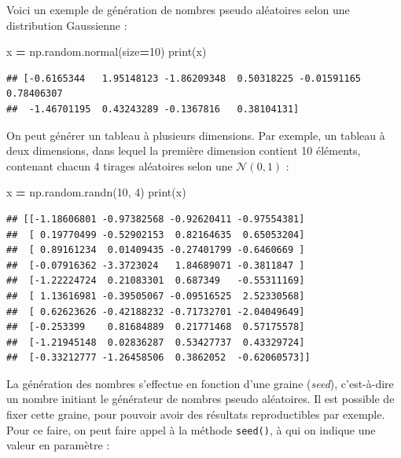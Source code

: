 \documentclass[
  12pt,
]{book}
\newenvironment{Shaded}{\begin{snugshade}}{\end{snugshade}}
\newcommand{\BuiltInTok}[1]{#1}
\newcommand{\DecValTok}[1]{\textcolor[rgb]{0.00,0.00,0.81}{#1}}
\newcommand{\NormalTok}[1]{#1}
\newcommand{\OperatorTok}[1]{\textcolor[rgb]{0.81,0.36,0.00}{\textbf{#1}}}
\numberwithin{equation}{section}
\numberwithin{countremarque}{section}
\begin{document}
Voici un exemple de génération de nombres pseudo aléatoires selon une distribution Gaussienne :

\begin{Shaded}
\begin{Highlighting}[]
\NormalTok{x }\OperatorTok{=}\NormalTok{ np.random.normal(size}\OperatorTok{=}\DecValTok{10}\NormalTok{)}
\BuiltInTok{print}\NormalTok{(x)}
\end{Highlighting}
\end{Shaded}

\begin{lstlisting}
## [-0.6165344   1.95148123 -1.86209348  0.50318225 -0.01591165  0.78406307
##  -1.46701195  0.43243289 -0.1367816   0.38104131]
\end{lstlisting}

On peut générer un tableau à plusieurs dimensions. Par exemple, un tableau à deux dimensions, dans lequel la première dimension contient 10 éléments, contenant chacun 4 tirages aléatoires selon une \(\mathcal{N}(0,1)\) :

\begin{Shaded}
\begin{Highlighting}[]
\NormalTok{x }\OperatorTok{=}\NormalTok{ np.random.randn(}\DecValTok{10}\NormalTok{, }\DecValTok{4}\NormalTok{)}
\BuiltInTok{print}\NormalTok{(x)}
\end{Highlighting}
\end{Shaded}

\begin{lstlisting}
## [[-1.18606801 -0.97382568 -0.92620411 -0.97554381]
##  [ 0.19770499 -0.52902153  0.82164635  0.65053204]
##  [ 0.89161234  0.01409435 -0.27401799 -0.6460669 ]
##  [-0.07916362 -3.3723024   1.84689071 -0.3811847 ]
##  [-1.22224724  0.21083301  0.687349   -0.55311169]
##  [ 1.13616981 -0.39505067 -0.09516525  2.52330568]
##  [ 0.62623626 -0.42188232 -0.71732701 -2.04049649]
##  [-0.253399    0.81684889  0.21771468  0.57175578]
##  [-1.21945148  0.02836287  0.53427737  0.43329724]
##  [-0.33212777 -1.26458506  0.3862052  -0.62060573]]
\end{lstlisting}

La génération des nombres s'effectue en fonction d'une graine (\emph{seed}), c'est-à-dire un nombre initiant le générateur de nombres pseudo aléatoires. Il est possible de fixer cette graine, pour pouvoir avoir des résultats reproductibles par exemple. Pour ce faire, on peut faire appel à la méthode \texttt{seed()}, à qui on indique une valeur en paramètre :
\end{document}
